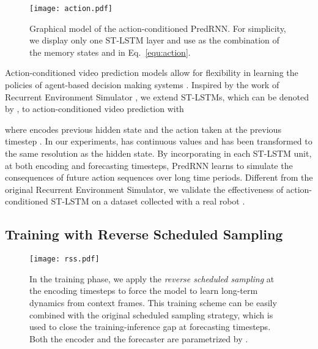 \documentclass[10pt,journal,compsoc]{IEEEtran}
\newcommand{\eqn}[1]{Eq.~\eqref{#1}}
\begin{document}
\begin{figure}[t]
  \centering
  \texttt{[image: action.pdf]}
  \caption{Graphical model of the action-conditioned PredRNN. For simplicity, we display only one ST-LSTM layer and use  as the combination of the memory states  and  in \eqn{equ:action}.
  }
  \label{fig:action}
  \vspace{-10pt}
\end{figure}


Action-conditioned video prediction models allow for flexibility in learning the policies of agent-based decision making systems \cite{Oh2015Action,Finn2016Unsupervised,chiappa2017recurrent,babaeizadeh2017stochastic,ebert2017self,hafner2018learning,hafner2020dream}.
Inspired by the work of Recurrent Environment Simulator \cite{chiappa2017recurrent}, we extend ST-LSTMs, which can be denoted by , to action-conditioned video prediction with

where  encodes previous hidden state  and the action taken at the previous timestep . 
In our experiments,  has continuous values and has been transformed to the same resolution as the hidden state. 
By incorporating  in each ST-LSTM unit, at both encoding and forecasting timesteps, PredRNN learns to simulate the consequences of future action sequences over long time periods.
Different from the original Recurrent Environment Simulator, we validate the effectiveness of action-conditioned ST-LSTM on a dataset collected with a real robot \cite{ebert2017self}.




\subsection{Training with Reverse Scheduled Sampling}
\label{method_curri}


\begin{figure*}[t]
  \centering
  \texttt{[image: rss.pdf]}
  \vskip -0.05in
  \caption{In the training phase, we apply the \textit{reverse scheduled sampling} at the encoding timesteps to force the model to learn long-term dynamics from context frames. This training scheme can be easily combined with the original scheduled sampling strategy, which is used to close the training-inference gap at forecasting timesteps. Both the encoder and the forecaster are parametrized by .}
  \label{fig:rss}
  \vspace{-10pt}
\end{figure*}
\end{document}
